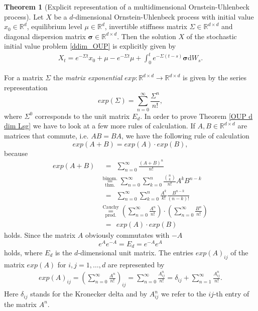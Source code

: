 \documentclass[11pt,titlepage]{article}
\newcommand{\R}{\mathbb{R}} %
\theoremstyle{definition}
\newtheorem{theorem}{Theorem}[section]
\theoremstyle{remark}
\begin{document}
	\begin{theorem}[Explicit representation of a multidimensional Ornstein-Uhlenbeck process]\label{Thm expl repr d dim OUP} \label{OUP d dim Lsg}
		Let $X$ be a $d$-dimensional Ornstein-Uhlenbeck process with initial value $x_0\in\R^d$,  equilibrium level $\mu\in\R^d$, invertible stiffness matrix $\Sigma\in\R^{d\times d}$ 
		and diagonal dispersion matrix $\boldsymbol{\sigma}\in\R^{d\times d}$. Then the solution $X$ of the stochastic initial value problem \ref{ddim_OUP} is explicitly given by
		\begin{align} \label{multidim expl repr OUP}
			X_t = e^{-\Sigma t}x_0+\mu-e^{-\Sigma t}\mu+\int_0^t e^{-\Sigma(t-s)}\boldsymbol{\sigma}\mathrm{d}W_s.
		\end{align}
	\end{theorem}
	\noindent
	For a matrix $\Sigma$ the \textsl{matrix exponential} $exp:\R^{d\times d}\to \R^{d\times d}$ is given by the series representation 
	\[exp(\Sigma)= \sum_{n=0}^{\infty} \frac{\Sigma^n}{n!},\]
	where $\Sigma^0$ corresponds to the unit matrix $E_d$. In order to prove 
	Theorem \ref{OUP d dim Lsg} we have to look at a few more rules of calculation. 
	If $A,B\in\R^{d\times d}$ are matrices that commute, i.e. $AB = BA$, we have the following rule of calculation 
	\[exp(A+B)=exp(A)\cdot exp(B),\]
	because
	\begin{align*}
		exp(A+B)&\ \ =\ \ \sum_{n=0}^{\infty} \frac{(A+B)^n}{n!}\\
		&\overset{\text{binom.}}{\underset{\text{thm.}}{=}}
		\sum_{n=0}^{\infty}\sum_{k=0}^n \frac{\binom{n}{k}}{n!}A^k B^{n-k}\\
		&\ \ =\ \ \sum_{n=0}^{\infty}\sum_{k=0}^n \frac{A^k}{k!}\frac{B^{n-k}}{(n-k)!}\\
		&\overset{\text{Cauchy}}{\underset{\text{prod.}}{=}}
		\left(\sum_{n=0}^{\infty}\frac{A^n}{n!}\right)\cdot \left(\sum_{n=0}^{\infty}\frac{B^n}{n!}\right)\\
		&\ \ =\ \ exp(A)\cdot exp(B)
	\end{align*}
	holds. Since the matrix $A$ obviously commutates with $-A$
	\[e^{A}e^{-A}= E_d = e^{-A}e^{A}\]
	holds, where $E_d$ is the $d$-dimensional unit matrix.
	The entries $exp(A)_{ij}$ of the matrix $exp(A)$ for $i,j=1,\ldots,d$ are represented by
	\begin{align}
		exp(A)_{ij}=\left(\sum_{n=0}^{\infty}\frac{A^n}{n!}\right)_{ij}
		=\sum_{n=0}^{\infty}\frac{A^n_{ij}}{n!}
		=\delta_{ij}+\sum_{n=1}^{\infty}\frac{A^n_{ij}}{n!}.\label{Eintr_exp_mat}
	\end{align}
	Here $\delta_{ij}$ stands for the Kronecker delta and by $A^n_{ij}$ we refer to the $ij$-th entry of the matrix $A^n$.
	
\end{document}
